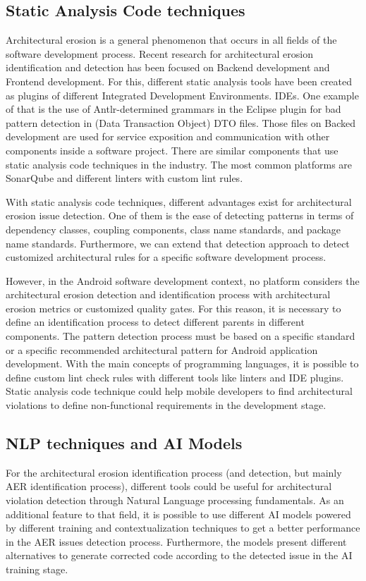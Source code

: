 \subsection{Static Analysis Code techniques}
Architectural erosion is a general phenomenon that occurs in all fields of the software development process. Recent research for architectural erosion identification and detection has been focused on Backend development and Frontend development. For this, different static analysis tools have been created as plugins of different Integrated Development Environments. IDEs. One example of that is the use of Antlr-determined grammars in the Eclipse plugin for bad pattern detection in (Data Transaction Object) DTO files. Those files on Backed development are used for service exposition and communication with other components inside a software project.
There are similar components that use static analysis code techniques in the industry. The most common platforms are SonarQube and different linters with custom lint rules.

With static analysis code techniques, different advantages exist for architectural erosion issue detection. One of them is the ease of detecting patterns in terms of dependency classes, coupling components, class name standards, and package name standards. Furthermore, we can extend that detection approach to detect customized architectural rules for a specific software development process. \cite{master-thesis-aer-backend}

However, in the Android software development context, no platform considers the architectural erosion detection and identification process with architectural erosion metrics or customized quality gates. For this reason, it is necessary to define an identification process to detect different parents in different components. The pattern detection process must be based on a specific standard or a specific recommended architectural pattern for Android application development. With the main concepts of programming languages, it is possible to define custom lint check rules with different tools like linters and IDE plugins. Static analysis code technique could help mobile developers to find architectural violations to define non-functional requirements in the development stage.


\subsection{NLP techniques and AI Models}
For the architectural erosion identification process (and detection, but mainly AER identification process), different tools could be useful for architectural violation detection through Natural Language processing fundamentals. As an additional feature to that field, it is possible to use different AI models powered by different training and contextualization techniques to get a better performance in the AER issues detection process. Furthermore, the models present different alternatives to generate corrected code according to the detected issue in the AI training stage.

